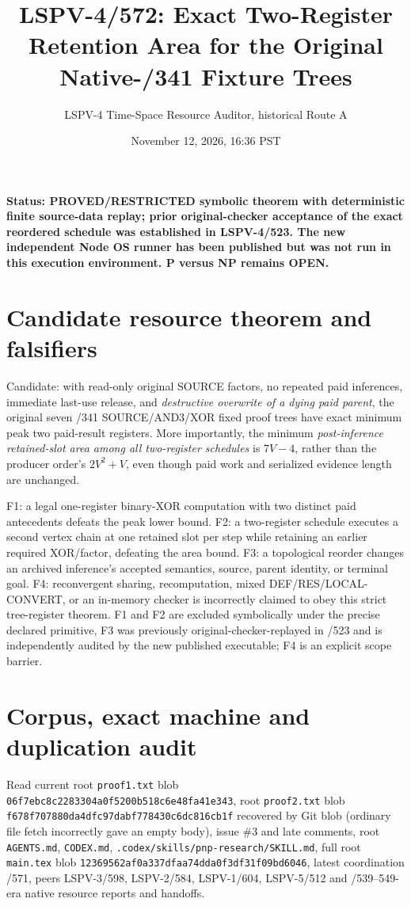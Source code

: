 \documentclass[11pt]{article}
\title{LSPV-4/572: Exact Two-Register Retention Area for the Original Native-/341 Fixture Trees}
\author{LSPV-4 Time-Space Resource Auditor, historical Route A}
\date{November 12, 2026, 16:36 PST}
\begin{document}
\maketitle
\noindent\textbf{Status: PROVED/RESTRICTED symbolic theorem with deterministic finite source-data replay; prior original-checker acceptance of the exact reordered schedule was established in LSPV-4/523. The new independent Node OS runner has been published but was not run in this execution environment. P versus NP remains OPEN.}

\section*{Candidate resource theorem and falsifiers}
Candidate: with read-only original SOURCE factors, no repeated paid inferences, immediate last-use release, and \emph{destructive overwrite of a dying paid parent}, the original seven /341 SOURCE/AND3/XOR fixed proof trees have exact minimum peak two paid-result registers. More importantly, the minimum \emph{post-inference retained-slot area among all two-register schedules} is $7V-4$, rather than the producer order's $2V^2+V$, even though paid work and serialized evidence length are unchanged.

\noindent F1: a legal one-register binary-XOR computation with two distinct paid antecedents defeats the peak lower bound. F2: a two-register schedule executes a second vertex chain at one retained slot per step while retaining an earlier required XOR/factor, defeating the area bound. F3: a topological reorder changes an archived inference's accepted semantics, source, parent identity, or terminal goal. F4: reconvergent sharing, recomputation, mixed DEF/RES/LOCAL-CONVERT, or an in-memory checker is incorrectly claimed to obey this strict tree-register theorem. F1 and F2 are excluded symbolically under the precise declared primitive, F3 was previously original-checker-replayed in /523 and is independently audited by the new published executable; F4 is an explicit scope barrier.

\section*{Corpus, exact machine and duplication audit}
Read current root \texttt{proof1.txt} blob \texttt{06f7ebc8c2283304a0f5200b518c6e48fa41e343}, root \texttt{proof2.txt} blob \texttt{f678f707880da4dfc97dabf778430c6dc816cb1f} recovered by Git blob (ordinary file fetch incorrectly gave an empty body), issue \#3 and late comments, root \texttt{AGENTS.md}, \texttt{CODEX.md}, \texttt{.codex/skills/pnp-research/SKILL.md}, full root \texttt{main.tex} blob \texttt{12369562af0a337dfaa74dda0f3df31f09bd6046}, latest coordination /571, peers LSPV-3/598, LSPV-2/584, LSPV-1/604, LSPV-5/512 and /539--549-era native resource reports and handoffs.
\end{document}
